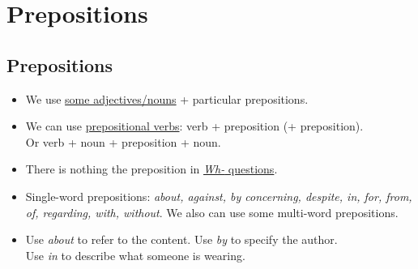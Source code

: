 \section{Prepositions}

\subsection{Prepositions}
\begin{itemize}
    \item We use \underline{some adjectives/nouns} + particular prepositions.
    \item We can use \underline{prepositional verbs}: verb + preposition (+ preposition).\\
    Or verb + noun + preposition + noun.
    \item There is nothing  the preposition in \underline{\textit{Wh-} questions}.
    \item Single-word prepositions: \textit{about, against, by concerning, despite, in, for, from, of, regarding,
        with, without}. We also can use some multi-word prepositions.
    \item[\ast] Use \textit{about} to refer to the content. Use \textit{by} to specify the author.\\
    Use \textit{in} to describe what someone is wearing.
\end{itemize}

